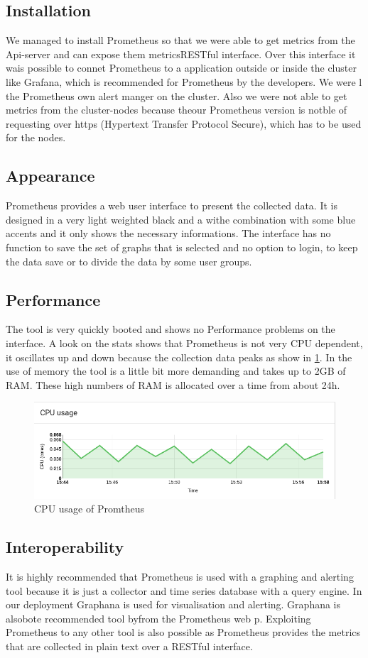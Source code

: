 \subsection{Installation}
We managed to install Prometheus so that we were able to get metrics from the Api-server and can expose them metricsRESTful interface. Over this interface it wais possible to connet Prometheus to a application outside or inside the cluster like Grafana, which is recommended for Prometheus by the developers. We were l the Prometheus own alert manger on the cluster. Also we were not able to get metrics from the cluster-nodes because theour Prometheus version is notble of requesting over https (Hypertext Transfer Protocol Secure), which has to be used for the nodes. 
\subsection{Appearance}%
Prometheus provides a web user interface to present the collected data. It is designed in a very light weighted black and a withe combination with some blue accents and it only shows the necessary informations. The interface has no function to save the set of graphs that is selected and no option to login, to keep the data save or to divide the data by some user groups.   
\subsection{Performance}
The tool is very quickly booted and shows no Performance problems on the interface. A look on the stats shows that Prometheus is not very CPU dependent, it oscillates up and down because the collection data peaks as show in \cref{fig:Prometeus_Cpu}. In the use of memory the tool is a little bit more demanding and takes up to 2GB of RAM. These high numbers of RAM is allocated over a time from about 24h. 
\begin{figure}
\centering
\includegraphics[width=0.5\linewidth]{Bilder/Performance/Prometeus_Cpu}
\caption{CPU usage of Promtheus}
\label{fig:Prometeus_Cpu}
\end{figure}
\subsection{Interoperability}
It is highly recommended that Prometheus is used with a graphing and alerting tool because it is just a collector and time series database with a query engine. In our deployment Graphana is used for visualisation and alerting. Graphana is alsobote recommended tool byfrom the Prometheus web p\cite{prometheus}. Exploiting Prometheus to any other tool is also possible as Prometheus provides the metrics that are collected in plain text over a RESTful interface.
